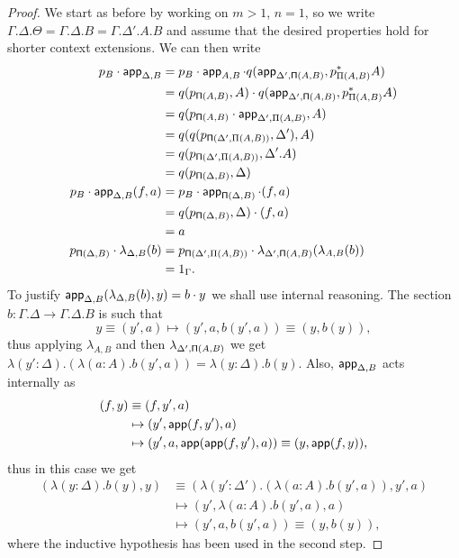 \begin{proof}
  We start as before by working on $m>1$, $n=1$, so we write
  $\Gamma.\Delta.\Theta=\Gamma.\Delta.B=\Gamma.\Delta'.A.B$ and assume that
  the desired properties hold for shorter context extensions.
  We can then write
  \begin{align*}
    p_B\cdot\operatorname{\mathsf{app}}_{\Delta,B}
    &=p_B\cdot
    \operatorname{\mathsf{app}}_{A,B}\cdot
    q(\operatorname{\mathsf{app}}_{\Delta',\operatorname{\mathsf{\Pi}}(A,B)},p^*_{\Pi(A,B)}A) \\
    &=q(p_{\operatorname{\mathsf{\Pi}}(A,B)},A)\cdot
    q(\operatorname{\mathsf{app}}_{\Delta',\operatorname{\mathsf{\Pi}}(A,B)},p^*_{\Pi(A,B)}A) \\
    &=q(p_{\operatorname{\mathsf{\Pi}}(A,B)}\cdot\operatorname{\mathsf{app}}_{\Delta',\Pi(A,B)},A) \\
    &=q(q(p_{\operatorname{\mathsf{\Pi}}(\Delta',\Pi(A,B))},\Delta'),A) \\
    &=q(p_{\operatorname{\mathsf{\Pi}}(\Delta',\Pi(A,B))},\Delta'.A) \\
    &=q(p_{\operatorname{\mathsf{\Pi}}(\Delta,B)},\Delta) \\
    p_B\cdot\operatorname{\mathsf{app}}_{\Delta,B}(f,a)
    &=p_B\cdot
    \operatorname{\mathsf{app}}_{\operatorname{\mathsf{\Pi}}(\Delta,B)}\cdot
    (f,a) \\
    &=q(p_{\operatorname{\mathsf{\Pi}}(\Delta,B)},\Delta)\cdot
    (f,a) \\
    &=a \\
    p_{\operatorname{\mathsf{\Pi}}(\Delta,B)}\cdot\lambda_{\Delta,B}(b)
    &=p_{\operatorname{\mathsf{\Pi}}(\Delta',\Pi(A,B))}\cdot
    \lambda_{\Delta',\operatorname{\mathsf{\Pi}}(A,B)}(\lambda_{A,B}(b)) \\
    &=1_\Gamma.
  \end{align*}
  To justify $\operatorname{\mathsf{app}}_{\Delta,B}(\lambda_{\Delta,B}(b),y)=b\cdot y$ we shall use
  internal reasoning. The section
  $b\colon\Gamma.\Delta\rightarrow\Gamma.\Delta.B$ is
  such that\[y\equiv (y',a)\mapsto(y',a,b(y',a))\equiv(y,b(y)),\] thus
  applying $\lambda_{A,B}$ and then $\lambda_{\Delta',\operatorname{\mathsf{\Pi}}(A,B)}$ we get
  $\lambda(y':\Delta).(\lambda(a:A).b(y',a))=\lambda(y:\Delta).b(y)$. Also,
  $\operatorname{\mathsf{app}}_{\Delta,B}$ acts internally as
  \begin{align*}
    (f,y)&\equiv(f,y',a) \\
    &\mapsto
    (y',\operatorname{\mathsf{app}}(f,y'),a) \\
    &\mapsto
    (y',a,\operatorname{\mathsf{app}}(\operatorname{\mathsf{app}}(f,y'),a))\equiv(y,\operatorname{\mathsf{app}}(f,y)),
  \end{align*}
  thus in this case we get
  \begin{align*}
    (\lambda(y:\Delta).b(y),y)&\equiv(\lambda(y':\Delta').(\lambda(a:A).b(y',a)),y',a) \\
    &\mapsto
    (y',\lambda(a:A).b(y',a),a) \\
    &\mapsto
    (y',a,b(y',a))\equiv(y,b(y)),
  \end{align*}
  where the inductive hypothesis has been used in the second step.
  

\end{proof}

